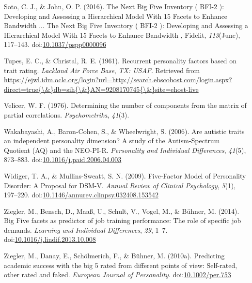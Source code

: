 \documentclass[,man,floatsintext]{apa6}
\theoremstyle{definition}
\theoremstyle{definition}
\theoremstyle{definition}
\theoremstyle{remark}
\begin{document}
\leavevmode\hypertarget{ref-SotoJohn2016}{}%
Soto, C. J., \& John, O. P. (2016). The Next Big Five Inventory ( BFI-2
): Developing and Assessing a Hierarchical Model With 15 Facets to
Enhance Bandwidth ... The Next Big Five Inventory ( BFI-2 ): Developing
and Assessing a Hierarchical Model With 15 Facets to Enhance Bandwidth ,
Fidelit, \emph{113}(June), 117--143.
doi:\href{https://doi.org/10.1037/pspp0000096}{10.1037/pspp0000096}

\leavevmode\hypertarget{ref-TupesChristal1961}{}%
Tupes, E. C., \& Christal, R. E. (1961). Recurrent personality factors
based on trait rating. \emph{Lackland Air Force Base}, \emph{TX: USAF}.
Retrieved from
\href{https://ejwl.idm.oclc.org/login?url=http://search.ebscohost.com/login.aspx?direct=true\%7B/\&\%7Ddb=sih\%7B/\&\%7DAN=9208170745\%7B/\&\%7Dsite=ehost-live}{https://ejwl.idm.oclc.org/login?url=http://search.ebscohost.com/login.aspx?direct=true\{\textbackslash{}\&\}db=sih\{\textbackslash{}\&\}AN=9208170745\{\textbackslash{}\&\}site=ehost-live}

\leavevmode\hypertarget{ref-Velicer1976}{}%
Velicer, W. F. (1976). Determining the number of components from the
matrix of partial correlations. \emph{Psychometrika}, \emph{41}(3).

\leavevmode\hypertarget{ref-Wakabayashi2006}{}%
Wakabayashi, A., Baron-Cohen, S., \& Wheelwright, S. (2006). Are
autistic traits an independent personality dimension? A study of the
Autism-Spectrum Quotient (AQ) and the NEO-PI-R. \emph{Personality and
Individual Differences}, \emph{41}(5), 873--883.
doi:\href{https://doi.org/10.1016/j.paid.2006.04.003}{10.1016/j.paid.2006.04.003}

\leavevmode\hypertarget{ref-WidigerMullins2009}{}%
Widiger, T. A., \& Mullins-Sweatt, S. N. (2009). Five-Factor Model of
Personality Disorder: A Proposal for DSM-V. \emph{Annual Review of
Clinical Psychology}, \emph{5}(1), 197--220.
doi:\href{https://doi.org/10.1146/annurev.clinpsy.032408.153542}{10.1146/annurev.clinpsy.032408.153542}

\leavevmode\hypertarget{ref-Ziegler2014}{}%
Ziegler, M., Bensch, D., Maaß, U., Schult, V., Vogel, M., \& Bühner, M.
(2014). Big Five facets as predictor of job training performance: The
role of specific job demands. \emph{Learning and Individual
Differences}, \emph{29}, 1--7.
doi:\href{https://doi.org/10.1016/j.lindif.2013.10.008}{10.1016/j.lindif.2013.10.008}

\leavevmode\hypertarget{ref-Ziegler2010a}{}%
Ziegler, M., Danay, E., Schölmerich, F., \& Bühner, M. (2010a).
Predicting academic success with the big 5 rated from different points
of view: Self-rated, other rated and faked. \emph{European Journal of
Personality}.
doi:\href{https://doi.org/10.1002/per.753}{10.1002/per.753}
\end{document}
